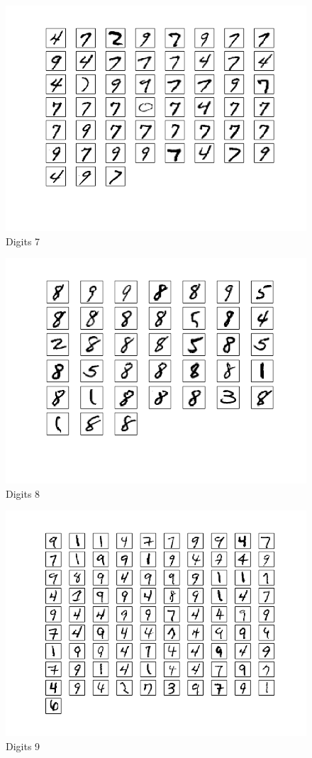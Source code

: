 \documentclass[10pt]{article}
\begin{document}
\begin{figure}
\begin{center}
\includegraphics[scale=0.5]{medoidsA7}
\caption{Digits 7}
\end{center}
\end{figure}
\begin{figure}
\begin{center}
\includegraphics[scale=0.5]{medoidsA8}
\caption{Digits 8}
\end{center}
\end{figure}
\begin{figure}
\begin{center}
\includegraphics[scale=0.5]{medoidsA9}
\caption{Digits 9}
\end{center}
\end{figure}
\end{document}
